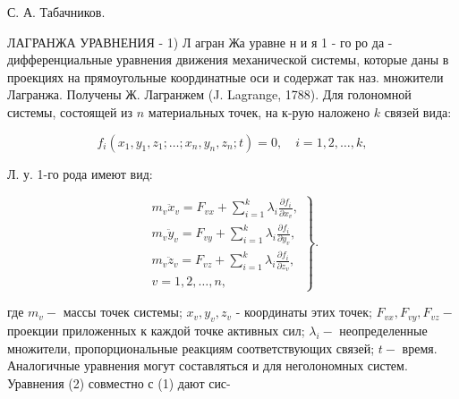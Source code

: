 \documentclass[10pt]{article}
\begin{document}
С. А. Табачников.



ЛАГРАНЖА УРАВНЕНИЯ - 1) Л агран Жа уравне н и я 1 - го ро да - дифференциальные уравнения движения механической системы, которые даны в проекциях на прямоугольные координатные оси и содержат так наз. множители Лагранжа. Получены Ж. Лагранжем (J. Lagrange, 1788). Для голономной системы, состоящей из $n$ материальных точек, на к-рую наложено $k$ связей вида:



\[

f_{i}\left(x_{1}, y_{1}, z_{1} ; \ldots ; x_{n}, y_{n}, z_{n} ; t\right)=0, \quad i=1,2, \ldots, k,

\]



Л. у. 1-го рода имеют вид:



\[

\left.\begin{array}{c}

m_{v} \ddot{x}_{v}=F_{v x}+\sum_{i=1}^{k} \lambda_{i} \frac{\partial f_{i}}{\partial x_{v}}, \\

m_{v} \ddot{y}_{v}=F_{v y}+\sum_{i=1}^{k} \lambda_{i} \frac{\partial f_{i}}{\partial y_{v}}, \\

m_{v} \ddot{z}_{v}=F_{v z}+\sum_{i=1}^{k} \lambda_{i} \frac{\partial f_{i}}{\partial z_{v}}, \\

v=1,2, \ldots, n,

\end{array}\right\} .

\]



где $m_{v}-$ массы точек системы; $x_{v}, y_{v}, z_{v}$ - координаты этих точек; $F_{v x}, F_{v y}, F_{v z}-$ проекции приложенных к каждой точке активных сил; $\lambda_{i}-$ неопределенные множители, пропорциональные реакциям соответствующих связей; $t-$ время. Аналогичные уравнения могут составляться и для неголономных систем. Уравнения (2) совместно с (1) дают сис-
\end{document}
